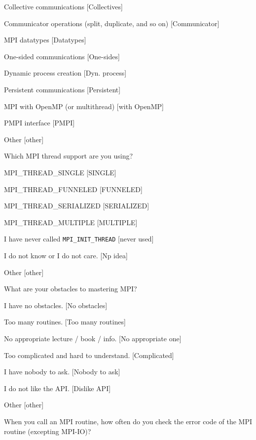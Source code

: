 \documentclass[conference,10pt,letterpaper]{IEEEtran}
\begin{document}
{{\begin{description}
\begin{inparaenum}[{\bf C}1)]
    \item Collective communications [Collectives]
    \item Communicator operations (split, duplicate, and so on) [Communicator]
    \item MPI datatypes [Datatypes]
    \item One-sided communications [One-sides]
    \item Dynamic process creation [Dyn. process]
    \item Persistent communications [Persistent]
    \item MPI with OpenMP (or multithread) [with OpenMP]
    \item PMPI interface [PMPI]
    \item Other [other]
    \end{inparaenum}
  \item[Q18*:] Which MPI thread support are you using?
    \begin{inparaenum}[{\bf C}1)]
    \item MPI\_THREAD\_SINGLE [SINGLE]
    \item MPI\_THREAD\_FUNNELED [FUNNELED]
    \item MPI\_THREAD\_SERIALIZED [SERIALIZED] 
    \item MPI\_THREAD\_MULTIPLE [MULTIPLE]
    \item I have never called {\tt MPI\_INIT\_THREAD} [never used]
    \item I do not know or I do not care. [Np idea]
    \item Other [other]
    \end{inparaenum}
  \item[Q19*:] What are your obstacles to mastering MPI?
    \begin{inparaenum}[{\bf C}1)]
    \item I have no obstacles. [No obstacles]
    \item Too many routines. [Too many routines]
    \item No appropriate lecture / book / info. [No appropriate one]
    \item Too complicated and hard to understand. [Complicated]
    \item I have nobody to ask. [Nobody to ask]
    \item I do not like the API. [Dislike API]
    \item Other [other]
    \end{inparaenum}
  \item[Q20:] When you call an MPI routine, how often do you check the error code of the MPI routine  (excepting MPI-IO)?

\end{description}}}
\end{document}
